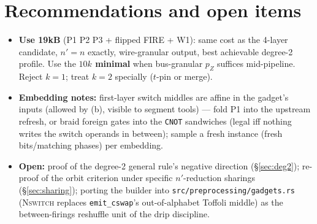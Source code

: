 \documentclass[11pt]{article}
\theoremstyle{remark}
\newcommand{\CNOT}{\texttt{CNOT}}
\newcommand{\NSW}{\textsc{Nswitch}}
\begin{document}
\section{Recommendations and open items}

\begin{itemize}
\item \textbf{Use 19kB} (P1 P2 P3 + flipped FIRE + W1): same cost as the 4-layer candidate,
$n'=n$ exactly, wire-granular output, best achievable degree-2 profile. Use the \textbf{$10k$
minimal} when bus-granular $p_Z$ suffices mid-pipeline. Reject $k=1$; treat $k=2$ specially
($t$-pin or merge).
\item \textbf{Embedding notes:} first-layer switch middles are affine in the gadget's inputs
(allowed by (b), visible to segment tools) --- fold P1 into the upstream refresh, or braid
foreign gates into the \CNOT{} sandwiches (legal iff nothing writes the switch operands in
between); sample a fresh instance (fresh bits/matching phases) per embedding.
\item \textbf{Open:} proof of the degree-2 general rule's negative direction (\S\ref{sec:deg2});
re-proof of the orbit criterion under specific $n'$-reduction sharings (\S\ref{sec:sharing});
porting the builder into \texttt{src/preprocessing/gadgets.rs} (\NSW{} replaces
\texttt{emit\_cswap}'s out-of-alphabet Toffoli middle) as the between-firings reshuffle unit of
the drip discipline.
\end{itemize}
\end{document}
